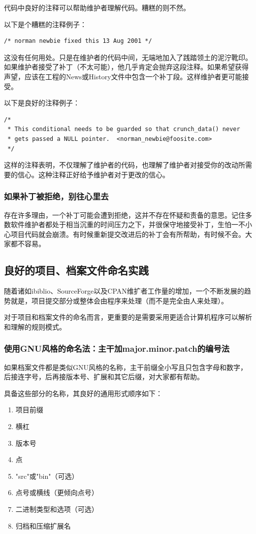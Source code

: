 \documentclass[12pt,oneside]{book}
\begin{document}
代码中良好的注释可以帮助维护者理解代码。糟糕的则不然。

以下是个糟糕的注释例子：
\begin{Verbatim}
/* norman newbie fixed this 13 Aug 2001 */
\end{Verbatim}

这没有任何用处。只是在维护者的代码中间，无端地加入了践踏领土的泥泞靴印。如果维护者接受了补丁（不太可能），他几乎肯定会抛弃这段注释。如果希望获得声望，应该在工程的News或History文件中包含一个补丁段。这样维护者更可能接受。

以下是良好的注释例子：
\begin{Verbatim}
/*
 * This conditional needs to be guarded so that crunch_data() never
 * gets passed a NULL pointer.  <norman_newbie@foosite.com>
 */
\end{Verbatim}

这样的注释表明，不仅理解了维护者的代码，也理解了维护者对接受你的改动所需要的信心。这种注释正好给予维护者对于更改的信心。

\subsubsection{如果补丁被拒绝，别往心里去}
存在许多理由，一个补丁可能会遭到拒绝，这并不存在怀疑和责备的意思。记住多数软件维护者都处于相当沉重的时间压力之下，并很保守地接受补丁，生怕一不小心项目代码就会崩溃。有时候重新提交改进后的补丁会有所帮助，有时候不会。大家都不容易。

\subsection{良好的项目、档案文件命名实践}
随着诸如ibiblio、SourceForge以及CPAN维扩者工作量的增加，一个不断发展的趋势就是，项目提交部分或整体会由程序来处理（而不是完全由人来处理）。

对于项目和档案文件的命名而言，更重要的是需要采用更适合计算机程序可以解析和理解的规则模式。

\subsubsection{使用GNU风格的命名法：主干加major.minor.patch的编号法}
如果档案文件都是类似GNU风格的名称，主干前缀全小写且只包含字母和数字，后接连字号，后再接版本号、扩展和其它后缀，对大家都有帮助。

具备这些部分的名称，其良好的通用形式顺序如下：
\begin{enumerate}
\item 项目前缀
\item 横杠
\item 版本号
\item 点
\item "src"或"bin"（可选）
\item 点号或横线（更倾向点号）
\item 二进制类型和选项（可选）
\item 归档和压缩扩展名
\end{enumerate}
\end{document}
